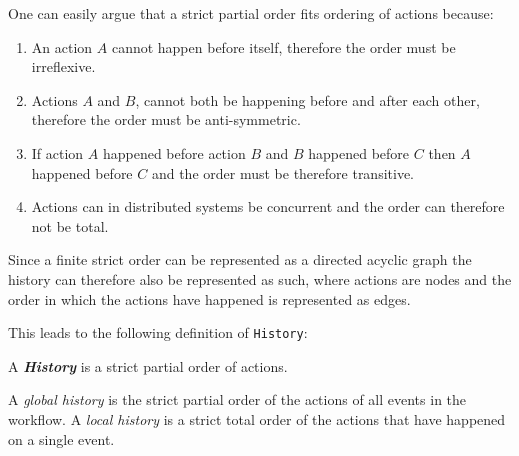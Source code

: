 	\newpar One can easily argue that a strict partial order fits ordering of actions because:
	\begin{enumerate}
		\item An action $A$ cannot happen before itself, therefore the order must be irreflexive.
		\item Actions $A$ and $B$, cannot both be happening before and after each other, therefore the order must be anti-symmetric.
		\item If action $A$ happened before action $B$ and $B$ happened before $C$ then $A$ happened before $C$ and the order must be therefore transitive.
		\item Actions can in distributed systems be concurrent and the order can therefore not be total.
	\end{enumerate}
	\newpar Since a finite strict order can be represented as a directed acyclic graph the history can therefore also be represented as such, where actions are nodes and the order in which the actions have happened is represented as edges.
	
	\newpar This leads to the following definition of \texttt{History}:
	
	\begin{definition}
		A \textit{\textbf{History}} is a strict partial order of actions.
	\end{definition}
	
    \newpar 
    A \textit{global history} is the strict partial order of the actions of all events in the workflow. A \textit{local history} is a strict total order of the actions that have happened on a single event. 
	
